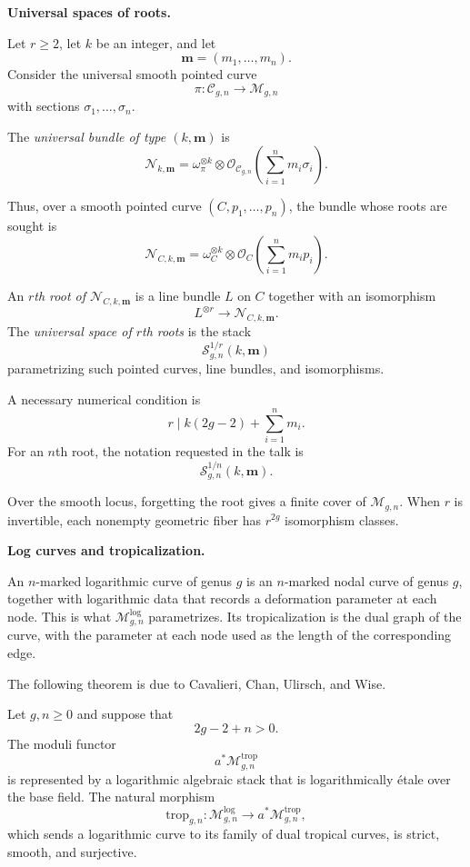 \medskip\noindent
{\bf Universal spaces of roots.}

Let $r\geq 2$, let $k$ be an integer,
and let
$$
\mathbf{m}=(m_1,\ldots,m_n).
$$
Consider the universal smooth pointed
curve
$$
\pi\colon \mathcal{C}_{g,n}
\longrightarrow \mathcal{M}_{g,n}
$$
with sections $\sigma_1,\ldots,\sigma_n$.

\begin{definition}
The {\it universal bundle of type
$(k,\mathbf{m})$} is
$$
\mathcal{N}_{k,\mathbf{m}}
=
\omega_{\pi}^{\otimes k}
\otimes
\mathcal{O}_{\mathcal{C}_{g,n}}
\left(
\sum_{i=1}^{n}m_i\sigma_i
\right).
$$
\end{definition}

Thus, over a smooth pointed curve
$(C,p_1,\ldots,p_n)$, the bundle whose
roots are sought is
$$
\mathcal{N}_{C,k,\mathbf{m}}
=
\omega_C^{\otimes k}
\otimes
\mathcal{O}_C
\left(
\sum_{i=1}^{n}m_ip_i
\right).
$$

\begin{definition}
An {\it $r$th root of
$\mathcal{N}_{C,k,\mathbf{m}}$} is a line
bundle $L$ on $C$ together with an
isomorphism
$$
L^{\otimes r}
\longrightarrow
\mathcal{N}_{C,k,\mathbf{m}}.
$$
The {\it universal space of $r$th roots}
is the stack
$$
\mathcal{S}^{1/r}_{g,n}
(k,\mathbf{m})
$$
parametrizing such pointed curves,
line bundles, and isomorphisms.
\end{definition}

A necessary numerical condition is
$$
r\mid
k(2g-2)+\sum_{i=1}^{n}m_i.
$$
For an $n$th root, the notation requested
in the talk is
$$
\mathcal{S}^{1/n}_{g,n}
(k,\mathbf{m}).
$$

Over the smooth locus, forgetting the
root gives a finite cover of
$\mathcal{M}_{g,n}$.  When $r$ is
invertible, each nonempty geometric fiber
has $r^{2g}$ isomorphism classes.

\medskip\noindent
{\bf Log curves and tropicalization.}

An $n$-marked logarithmic curve of genus
$g$ is an $n$-marked nodal curve of genus
$g$, together with logarithmic data that
records a deformation parameter at each
node.  This is what
$\mathcal{M}_{g,n}^{\log}$ parametrizes.
Its tropicalization is the dual graph of
the curve, with the parameter at each node
used as the length of the corresponding
edge.

The following theorem is due to
Cavalieri, Chan, Ulirsch, and Wise.

\begin{theorem}
\label{theorem-log-curves-tropicalization}
Let $g,n\geq 0$ and suppose that
$$
2g-2+n>0.
$$
The moduli functor
$$
a^{*}\mathcal{M}_{g,n}^{\mathrm{trop}}
$$
is represented by a logarithmic algebraic
stack that is logarithmically \'etale over
the base field.  The natural morphism
$$
\mathrm{trop}_{g,n}\colon
\mathcal{M}_{g,n}^{\log}
\longrightarrow
a^{*}\mathcal{M}_{g,n}^{\mathrm{trop}},
$$
which sends a logarithmic curve to its
family of dual tropical curves, is strict,
smooth, and surjective.
\end{theorem}

